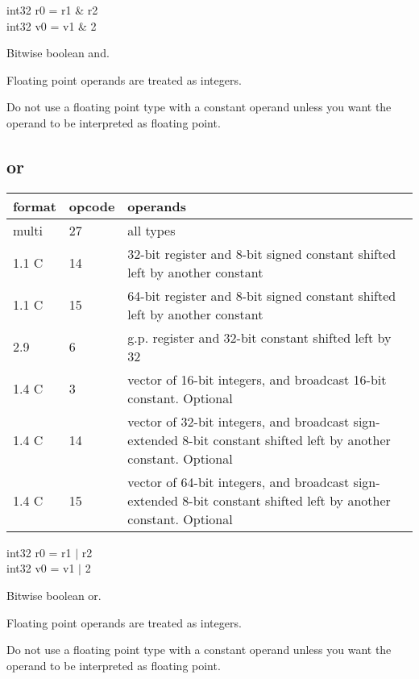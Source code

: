 \documentclass[forwardcom.tex]{subfiles}
\begin{document}
int32 r0 = r1 \& r2 \\
int32 v0 = v1 \& 2
\vv

Bitwise boolean and.
\vv

Floating point operands are treated as integers.

Do not use a floating point type with a constant operand unless you want the operand to be interpreted as floating point.
\vv

\subsection{or}
\label{table:orInstruction}
\begin{tabular}{|p{12mm}|p{12mm}|p{110mm}|}
\hline
\bfseries format & \bfseries opcode & \bfseries operands \\ \hline
multi & 27 & all types \\ \hline
1.1 C & 14 & 32-bit register and 8-bit signed constant shifted left by another constant \\ \hline
1.1 C & 15 & 64-bit register and 8-bit signed constant shifted left by another constant \\ \hline
2.9   &  6 & g.p. register and 32-bit constant shifted left by 32 \\ \hline
1.4 C &  3 & vector of 16-bit integers, and broadcast 16-bit constant. Optional \\ \hline
1.4 C & 14 & vector of 32-bit integers, and broadcast sign-extended 8-bit constant shifted left by another constant. Optional \\ \hline
1.4 C & 15 & vector of 64-bit integers, and broadcast sign-extended 8-bit constant shifted left by another constant. Optional \\ \hline
\end{tabular}
\vv

int32 r0 = r1 $|$ r2 \\
int32 v0 = v1 $|$ 2
\vv

Bitwise boolean or.
\vv

Floating point operands are treated as integers.

Do not use a floating point type with a constant operand unless you want the operand to be interpreted as floating point.
\vv
\end{document}
